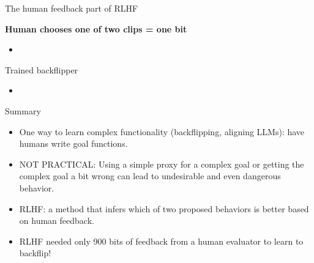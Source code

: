 \documentclass[11pt,compress,t,notes=noshow, xcolor=table]{beamer}
\begin{document}
\begin{vbframe}{The human feedback part of RLHF}

\vfill

\textbf{Human chooses one of two clips = one bit}

	\begin{itemize}
		\item \href{https://player.vimeo.com/video/754042470?h=e64a40690d&badge=0&autopause=0&player_id=0&app_id=58479}{}

	\end{itemize}

\vfill

\end{vbframe}

\begin{vbframe}{Trained backflipper}

\vfill

	\begin{itemize}
		\item 
                   \href{https://images.openai.com/blob/cf6fdf49-ea9e-489d-a1f1-9753291cd09e/humanfeedbackjump.gif}{}

        \end{itemize}

\vfill

\end{vbframe}


\begin{vbframe}{Summary}

\vfill

\textbf{}

	\begin{itemize}
	\item One way to
learn complex functionality (backflipping, aligning LLMs):
have humans 
		write goal functions.
		\item NOT PRACTICAL: Using a simple
		proxy for a complex goal or getting the
		complex goal a bit wrong can lead to
		undesirable and even dangerous behavior.
                \item
		RLHF: a method that  infers
which of two
		proposed behaviors is better 	based	on
                human feedback.
\item RLHF needed only 900 bits of feedback from a human
		evaluator to learn to backflip!
	\end{itemize}

\vfill

\end{vbframe}
\end{document}
